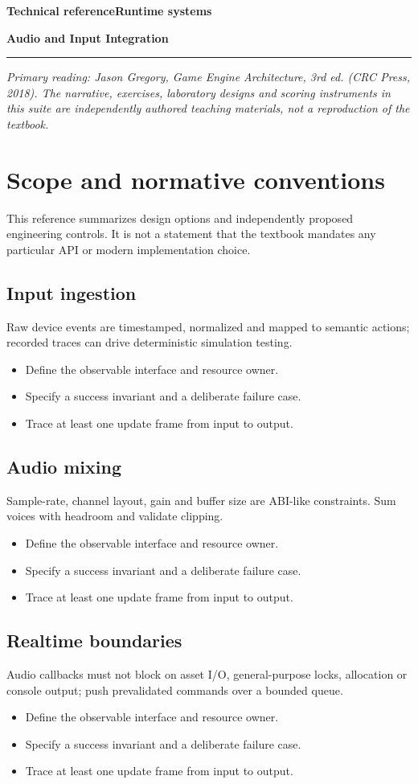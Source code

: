 \documentclass[11pt,letterpaper]{article}
\newcommand{\DocType}{Reference}
\newcommand{\SuiteHeading}[3]{%
\renewcommand{\DocType}{#2}%
{\small\bfseries\sffamily\color{EngineTeal}#2\hfill #3}\par\vspace{6pt}
{\LARGE\bfseries\color{EngineBlue}#1}\par\vspace{4pt}
{\color{EngineTeal}\rule{\linewidth}{1pt}}\par\vspace{7pt}}
\newcommand{\SourceNote}{\footnotesize\textit{Primary reading: Jason Gregory, \emph{Game Engine Architecture}, 3rd ed. (CRC Press, 2018). The narrative, exercises, laboratory designs and scoring instruments in this suite are independently authored teaching materials, not a reproduction of the textbook.}\normalsize\par}
\begin{document}
\SuiteHeading{Audio and Input Integration}{Technical reference}{Runtime systems}
\SourceNote
\section{Scope and normative conventions}
This reference summarizes design options and independently proposed engineering controls. It is not a statement that the textbook mandates any particular API or modern implementation choice.

\subsection{Input ingestion}
Raw device events are timestamped, normalized and mapped to semantic actions; recorded traces can drive deterministic simulation testing.

\begin{itemize}
\item Define the observable interface and resource owner.
\item Specify a success invariant and a deliberate failure case.
\item Trace at least one update frame from input to output.
\end{itemize}
\subsection{Audio mixing}
Sample-rate, channel layout, gain and buffer size are ABI-like constraints. Sum voices with headroom and validate clipping.

\begin{itemize}
\item Define the observable interface and resource owner.
\item Specify a success invariant and a deliberate failure case.
\item Trace at least one update frame from input to output.
\end{itemize}
\subsection{Realtime boundaries}
Audio callbacks must not block on asset I/O, general-purpose locks, allocation or console output; push prevalidated commands over a bounded queue.

\begin{itemize}
\item Define the observable interface and resource owner.
\item Specify a success invariant and a deliberate failure case.
\item Trace at least one update frame from input to output.
\end{itemize}
\end{document}
